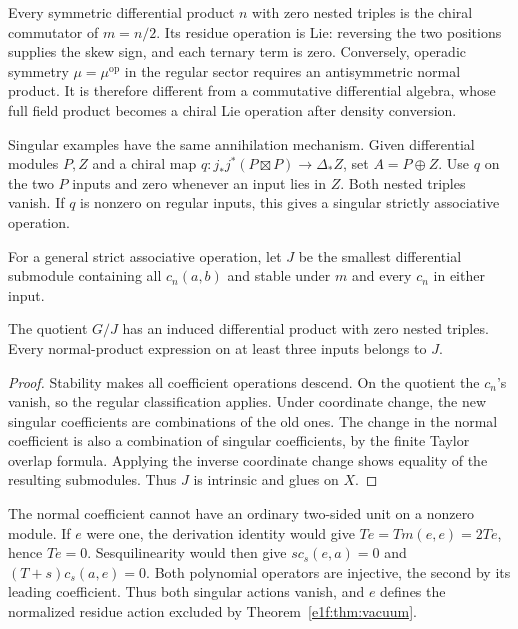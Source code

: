 Every symmetric differential product \(n\) with zero nested
triples is the chiral commutator of \(m=n/2\). Its residue
operation is Lie: reversing the two positions supplies the
skew sign, and each ternary term is zero. Conversely, operadic
symmetry \(\mu=\mu^{\mathrm{op}}\) in the regular sector
requires an antisymmetric normal product. It is therefore
different from a commutative differential algebra, whose full
field product becomes a chiral Lie operation after density
conversion.

Singular\label{e1c:def:singular-two-step-sum} examples have the same annihilation mechanism.
Given differential modules \(P,Z\) and a chiral map
\(q:j_*j^*(P\boxtimes P)\to\Delta_*Z\), set \(A=P\oplus Z\).
Use \(q\) on the two \(P\) inputs and zero whenever an input
lies in \(Z\). Both nested triples vanish. If \(q\) is
nonzero on regular inputs, this gives a singular strictly
associative operation.

For\label{e1c:def:singular-coefficient-ideal} a general strict associative operation, let \(J\) be the
smallest differential submodule containing all \(c_n(a,b)\)
and stable under \(m\) and every \(c_n\) in either input.

\begin{corollary}\label{e1c:cor:quotient}
The quotient \(G/J\) has an induced differential product
with zero nested triples. Every normal-product expression
on at least three inputs belongs to \(J\).
\end{corollary}

\begin{proof}
Stability makes all coefficient operations descend. On the
quotient the \(c_n\)'s vanish, so the regular classification
applies. Under coordinate change, the new singular coefficients
are combinations of the old ones. The change in the normal
coefficient is also a combination of singular coefficients,
by the finite Taylor overlap formula. Applying the inverse
coordinate change shows equality of the resulting submodules.
Thus \(J\) is intrinsic and glues on \(X\).
\end{proof}

The normal coefficient cannot have an ordinary two-sided unit
on a nonzero module. If \(e\) were one, the derivation identity
would give \(Te=T m(e,e)=2Te\), hence \(Te=0\).
Sesquilinearity would then give
\(s c_s(e,a)=0\) and \((T+s)c_s(a,e)=0\).
Both polynomial operators are injective, the second by its
leading coefficient. Thus both singular actions vanish, and
\(e\) defines the normalized residue action excluded by
Theorem~\ref{e1f:thm:vacuum}.

